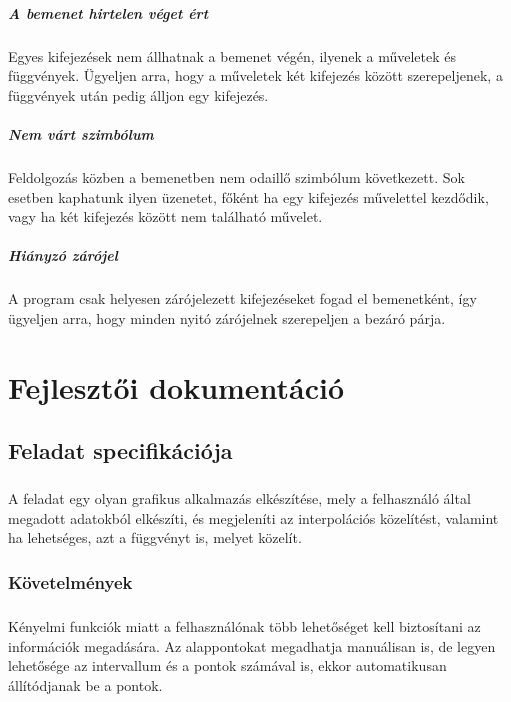 \documentclass[12pt]{report}
\begin{document}
\paragraph{A bemenet hirtelen véget ért}
Egyes kifejezések nem állhatnak a bemenet végén, ilyenek a műveletek és függvények. Ügyeljen arra, hogy a műveletek két kifejezés között szerepeljenek, a függvények után pedig álljon egy kifejezés.

\paragraph{Nem várt szimbólum}
Feldolgozás közben a bemenetben nem odaillő szimbólum következett. Sok esetben kaphatunk ilyen üzenetet, főként ha egy kifejezés művelettel kezdődik, vagy ha két kifejezés között nem található művelet.

\paragraph{Hiányzó zárójel}
A program csak helyesen zárójelezett kifejezéseket fogad el bemenetként, így ügyeljen arra, hogy minden nyitó zárójelnek szerepeljen a bezáró párja.

\chapter{Fejlesztői dokumentáció}

\section{Feladat specifikációja}
\paragraph{}
A feladat egy olyan grafikus alkalmazás elkészítése, mely a felhasználó által megadott adatokból elkészíti, és megjeleníti az interpolációs közelítést, valamint ha lehetséges, azt a függvényt is, melyet közelít.

\subsection{Követelmények}
\paragraph{}
Kényelmi funkciók miatt a felhasználónak több lehetőséget kell biztosítani az információk megadására. Az alappontokat megadhatja manuálisan is, de legyen lehetősége az intervallum és a pontok számával is, ekkor automatikusan állítódjanak be a pontok.
\end{document}
